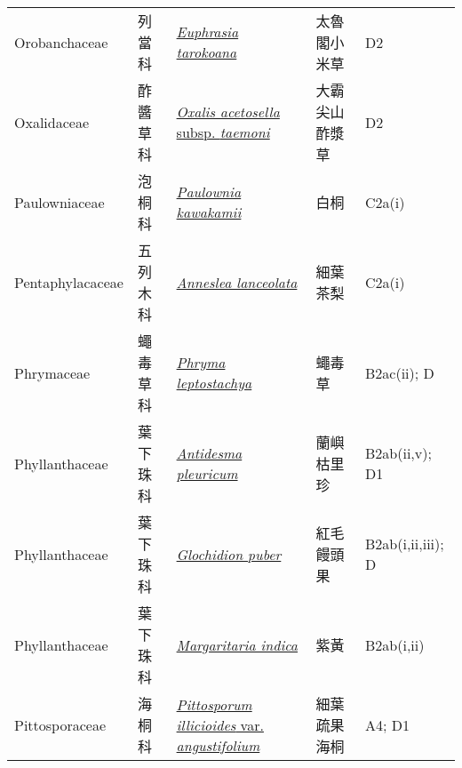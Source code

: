 {\begin{longtable}{p{2.5cm}p{2.5cm}p{4.5cm}p{2.5cm}p{3cm}}
    Orobanchaceae & 列當科 & \href{http://www.theplantlist.org/tpl1.1/search?q=Euphrasia+tarokoana}{\textit{Euphrasia tarokoana} } & 太魯閣小米草 & D2 \index{Euphrasia@\textit{Euphrasia}!tarokoana@\textit{tarokoana}}  \index{太魯閣小米草} \\
    Oxalidaceae & 酢醬草科 & \href{http://www.theplantlist.org/tpl1.1/search?q=Oxalis+acetosella+subsp.+taemoni}{\textit{Oxalis acetosella} subsp. \textit{taemoni} } & 大霸尖山酢漿草 & D2 \index{Oxalis@\textit{Oxalis}!acetosella@\textit{acetosella}!subsp. taemoni@subsp. \textit{taemoni}}  \index{大霸尖山酢漿草} \\
    Paulowniaceae & 泡桐科 & \href{http://www.theplantlist.org/tpl1.1/search?q=Paulownia+kawakamii}{\textit{Paulownia kawakamii} } & 白桐 & C2a(i) \index{Paulownia@\textit{Paulownia}!kawakamii@\textit{kawakamii}}  \index{白桐} \\
    Pentaphylacaceae & 五列木科 & \href{http://www.theplantlist.org/tpl1.1/search?q=Anneslea+lanceolata}{\textit{Anneslea lanceolata} } & 細葉茶梨 & C2a(i) \index{Anneslea@\textit{Anneslea}!lanceolata@\textit{lanceolata}}  \index{細葉茶梨} \\
    Phrymaceae & 蠅毒草科 & \href{http://www.theplantlist.org/tpl1.1/search?q=Phryma+leptostachya}{\textit{Phryma leptostachya} } & 蠅毒草 & B2ac(ii); D \index{Phryma@\textit{Phryma}!leptostachya@\textit{leptostachya}}  \index{蠅毒草} \\
    Phyllanthaceae & 葉下珠科 & \href{http://www.theplantlist.org/tpl1.1/search?q=Antidesma+pleuricum}{\textit{Antidesma pleuricum} } & 蘭嶼枯里珍 & B2ab(ii,v); D1 \index{Antidesma@\textit{Antidesma}!pleuricum@\textit{pleuricum}}  \index{蘭嶼枯里珍} \\
    Phyllanthaceae & 葉下珠科 & \href{http://www.theplantlist.org/tpl1.1/search?q=Glochidion+puber}{\textit{Glochidion puber} } & 紅毛饅頭果 & B2ab(i,ii,iii); D \index{Glochidion@\textit{Glochidion}!puber@\textit{puber}}  \index{紅毛饅頭果} \\
    Phyllanthaceae & 葉下珠科 & \href{http://www.theplantlist.org/tpl1.1/search?q=Margaritaria+indica}{\textit{Margaritaria indica} } & 紫黃 & B2ab(i,ii) \index{Margaritaria@\textit{Margaritaria}!indica@\textit{indica}}  \index{紫黃} \\
    Pittosporaceae & 海桐科 & \href{http://www.theplantlist.org/tpl1.1/search?q=Pittosporum+illicioides+var.+angustifolium}{\textit{Pittosporum illicioides} var. \textit{angustifolium} } & 細葉疏果海桐 & A4; D1 \index{Pittosporum@\textit{Pittosporum}!illicioides@\textit{illicioides}!var. angustifolium@var. \textit{angustifolium}}  \index{細葉疏果海桐} \\

\end{longtable}}
